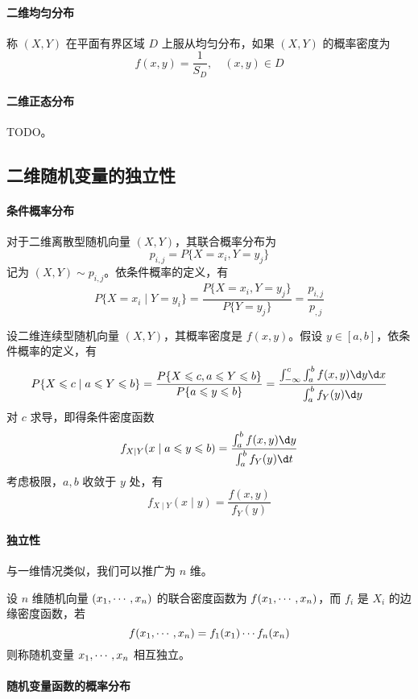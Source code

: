 \paragraph{二维均匀分布} 称 $(X,Y)$ 在平面有界区域 $D$ 上服从均匀分布，如果 $(X, Y)$ 的概率密度为
\[ f(x, y) = \frac{1}{S_D}, \quad (x, y) \in D \]

\paragraph{二维正态分布} TODO。

\subsection{二维随机变量的独立性}

\paragraph{条件概率分布}

对于二维离散型随机向量 $(X, Y)$，其联合概率分布为
\[ p_{i,j} = P\{X= x_i, Y = y_j\} \]
记为 $(X,Y) \sim p_{i,j}$。依条件概率的定义，有
\[ P\{ X = x_i \mid Y = y_i \} = \frac{P\{X = x_i, Y = y_j\}}{P\{Y=y_j\}} = \frac{p_{i, j}}{p_{, j}} \]

设二维连续型随机向量 $(X, Y)$，其概率密度是 $f(x, y)$。假设 $y \in [a, b]$，依条件概率的定义，有
\[ P\{X \leqslant c \mid a \leqslant Y \leqslant b\} = \frac{P\{X \leqslant c , a \leqslant Y \leqslant b\}}{P\{a \leqslant y \leqslant b \}} = \frac{\int_{-\infty}^c \int_{a}^b f(x, y) \d y \d x }{\int_a^b f_Y(y) \d y }\]
对 $c$ 求导，即得条件密度函数
\[ f_{X \mid Y}(x \mid a \leqslant y \leqslant b) = \frac{\int_{a}^b f(x, y) \d y}{\int_{a}^b f_{Y}(y) \d t} \]
考虑极限，$a, b$ 收敛于 $y$ 处，有
\[ f_{X \mid Y}(x \mid y) = \frac{f(x, y)}{f_{Y}(y)} \]

\paragraph{独立性}

与一维情况类似，我们可以推广为 $n$ 维。

\begin{definition}
	设 $n$ 维随机向量 $(x_1,\cdots,x_n)$ 的联合密度函数为 $f(x_1,\cdots,x_n)$，而 $f_i$ 是 $X_i$ 的边缘密度函数，若
	\[ f(x_1,\cdots,x_n) = f_1(x_1) \cdots f_n(x_n) \]
	则称随机变量 $x_1,\cdots,x_n$ 相互独立。
\end{definition}

\paragraph{随机变量函数的概率分布}

